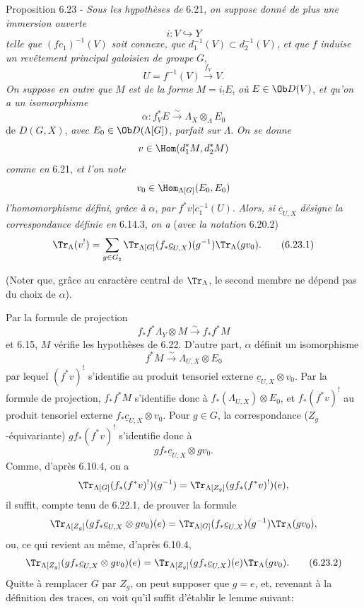 \begin{statement}{Proposition 6.23 -}
\emph{Sous les hypothèses de} 6.21, \emph{on suppose donné de plus une immersion ouverte}
\[
i:V\hookrightarrow Y
\]
\emph{telle que} $(fc_1)^{-1}(V)$ \emph{soit connexe, que} 
$d_1^{-1}(V)\subset d_2^{-1}(V)$, \emph{et que} $f$
\emph{induise un revêtement principal galoisien de groupe} $G$,
\[
U=f^{-1}(V)\xrightarrow{f_V}V.
\]
\emph{On suppose en outre que} $M$ \emph{est de la forme} $M=i_!E$, \emph{où} $E\in\Ob D(V)$, \emph{et qu'on a un isomorphisme}
\[
\alpha:f_V^*E\xrightarrow{\sim}\Lambda_X\otimes_{\Lambda}E_0
\]
de $D(G,X)$, \emph{avec} $E_0\in\Ob D(\Lambda[G])$, \emph{parfait sur} $\Lambda$. \emph{On se donne}
\[
v\in\Hom(d_1^*M,d_2^*M)
\]
\emph{comme en} 6.21, \emph{et l'on note}
\[
v_0\in\Hom_{\Lambda[G]}(E_0,E_0)
\]
\emph{l'homomorphisme défini}, \emph{grâce à} $\alpha$, \emph{par} $f^*v|c_1^{-1}(U)$. \emph{Alors, si} $\underline c_{U,X}$ \emph{désigne la correspondance définie en} 6.14.3, \emph{on a} (\emph{avec la notation} 6.20.2)
\begin{equation}
\Tr_{\Lambda}(v^!)
=
\sum_{g\in G_{\natural}}
\Tr_{\Lambda[G]}(f_*\underline c_{U,X})(g^{-1})\Tr_{\Lambda}(gv_0).
\tag{6.23.1}
\end{equation}
\end{statement}

(Noter que, grâce au caractère central de $\Tr_{\Lambda}$, le second membre ne dépend pas du choix de $\alpha$).

Par la formule de projection
\[
f_*f^*\Lambda_Y\otimes M\xrightarrow{\sim}f_*f^*M
\]
et 6.15, $M$ vérifie les hypothèses de 6.22. D'autre part, $\alpha$ définit un isomorphisme
\[
f^*M\xrightarrow{\sim}\Lambda_{U,X}\otimes E_0
\]
par lequel $(f^*v)^!$ s'identifie au produit tensoriel externe $\underline c_{U,X}\otimes v_0$. Par la formule de projection, $f_*f^*M$ s'identifie donc à $f_*(\Lambda_{U,X})\otimes E_0$, et $f_*(f^*v)^!$ au produit tensoriel externe $f_*\underline c_{U,X}\otimes v_0$. Pour $g\in G$, la correspondance ($Z_g$-équivariante) $gf_*(f^*v)^!$ s'identifie donc à
\[
gf_*\underline c_{U,X}\otimes gv_0.
\]
Comme, d'après 6.10.4, on a
\[
\Tr_{\Lambda[G]}(f_*(f^*v)^!)(g^{-1})
=
\Tr_{\Lambda[Z_g]}(gf_*(f^*v)^!)(e),
\]
il suffit, compte tenu de 6.22.1, de prouver la formule
\[
\Tr_{\Lambda[Z_g]}(gf_*\underline c_{U,X}\otimes gv_0)(e)
=
\Tr_{\Lambda[G]}(f_*\underline c_{U,X})(g^{-1})\Tr_{\Lambda}(gv_0),
\]
ou, ce qui revient au même, d'après 6.10.4,
\begin{equation}
\Tr_{\Lambda[Z_g]}(gf_*\underline c_{U,X}\otimes gv_0)(e)
=
\Tr_{\Lambda[Z_g]}(gf_*\underline c_{U,X})(e)\Tr_{\Lambda}(gv_0).
\tag{6.23.2}
\end{equation}
Quitte à remplacer $G$ par $Z_g$, on peut supposer que $g=e$, et, revenant à la définition des traces, on voit qu'il suffit d'établir le lemme suivant:

